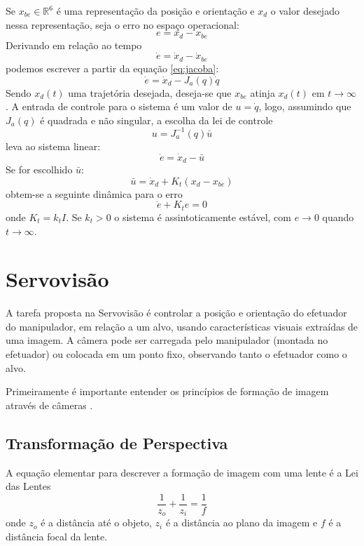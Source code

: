 Se ${x_{be}} \in \mathbb{R}^6$ é uma representação da posição e orientação e ${x}_d$ o valor desejado nessa representação, seja o erro no espaço operacional:
\begin{equation}
{e} = {x}_d - {x}_{be}
\end{equation}
Derivando em relação ao tempo
\begin{equation}
{\dot{e}} = {\dot{x}}_d - {\dot{x}_{be}}
\end{equation}
podemos escrever a partir da equação \ref{eq:jacoba}:
\begin{equation}
{\dot{e}} = {\dot{x}}_d - {J}_a({q})\dot{{q}}
\end{equation}
Sendo ${x}_d(t)$ uma trajetória desejada, deseja-se que ${x}_{be}$ atinja ${x}_d(t)$ em $t \to \infty$ .
A entrada de controle para o sistema é um valor de ${u} = \dot{{q}}$, logo, assumindo que ${J}_a({q})$ é quadrada e não singular, a escolha da lei de controle
\begin{equation}
{u} = {J}_a^{-1}({q})\bar{{u}}
\end{equation}
leva ao sistema linear:
\begin{equation}
\dot{{e}} = \dot{{x}}_d - \bar{{u}}
\end{equation}
Se for escolhido $\bar{{u}}$:
\begin{equation}
\bar{{u}} = \dot{{x}}_d + {K_t} ({x}_d - {x}_{be})
\end{equation}
obtem-se a seguinte dinâmica para o erro
\begin{equation}
\dot{{e}} + {K_t} {e} = 0
\end{equation}
onde $K_t = k_t I$. Se $k_t > 0$ o sistema é assintoticamente estável, com $e \rightarrow 0$ quando $t \to \infty$.

\section{Servovisão}
A tarefa proposta na Servovisão é controlar a posição e orientação do efetuador do manipulador, em relação a um alvo, usando características visuais extraídas de uma imagem. A câmera pode ser carregada pelo manipulador (montada no efetuador) ou colocada em um ponto fixo, observando tanto o efetuador como o alvo.

Primeiramente é importante entender os princípios de formação de imagem através de câmeras \citep{petercorke}. 

\subsection{Transformação de Perspectiva} \label{sec:camera_model}
A equação elementar para descrever a formação de imagem com uma lente é a Lei das Lentes
\begin{equation} 
\frac{1}{z_o} + \frac{1}{z_i} = \frac{1}{f}
\end{equation} 
onde $z_o$ é a distância até o objeto, $z_i$ é a distância ao plano da imagem e $f$ é a distância focal da lente.

